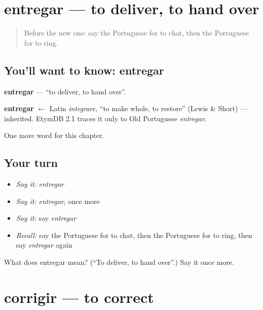 \section[entregar]{entregar — to deliver, to hand over}

\label{lesson:PT-C207-entregar}



\begin{quote}
Before the new one: say the Portuguese for to chat, then the Portuguese for to ring.
\end{quote}

\subsection*{You'll want to know: entregar}
\textbf{entregar} — \textquotedblleft{}to deliver, to hand over\textquotedblright{}.

\begin{cousinweb}
\textbf{entregar} $\leftarrow$ Latin \emph{integrare}, \textquotedblleft{}to make whole, to restore\textquotedblright{} (Lewis \& Short) — inherited. EtymDB 2.1 traces it only to Old Portuguese \emph{entregar}.
\end{cousinweb}

\begin{grammarlens}[title={What you've built}]
One more word for this chapter.
\end{grammarlens}

\subsection*{Your turn}
\begin{itemize}
\raggedright
  \item \emph{Say it:} \emph{entregar}
  \item \emph{Say it:} \emph{entregar}, once more
  \item \emph{Say it:} say \emph{entregar}
  \item \emph{Recall:} say the Portuguese for to chat, then the Portuguese for to ring, then say \emph{entregar} again
\end{itemize}

\begin{tcolorbox}[breakable,colback=teal!4,colframe=teal!35!black,title={Before you move on}]
What does entregar mean? (\textquotedblleft{}To deliver, to hand over\textquotedblright{}.) Say it once more.
\end{tcolorbox}
\section[corrigir]{corrigir — to correct}

